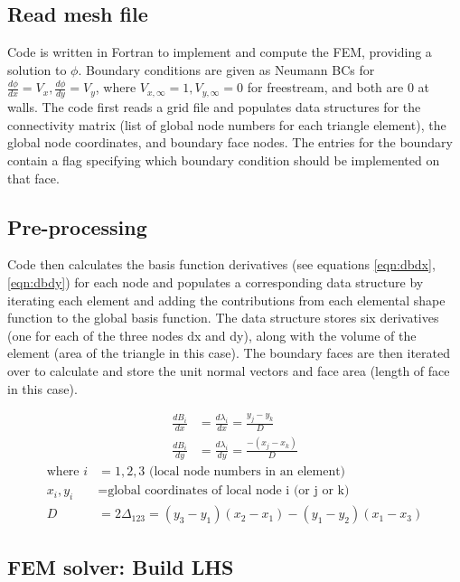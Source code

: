 \documentclass[conf]{new-aiaa}
\begin{document}
\subsection{Read mesh file}
\bigskip

Code is written in Fortran to implement and compute the FEM, providing a solution to $\phi$.  Boundary conditions are given as Neumann BCs for $\frac{d\phi}{dx} = V_x,\frac{d\phi}{dy} = V_y$, where $V_{x,\infty} = 1, V_{y,\infty} = 0$ for freestream, and both are 0 at walls.  The code first reads a grid file and populates data structures for the connectivity matrix (list of global node numbers for each triangle element), the global node coordinates, and boundary face nodes.  The entries for the boundary contain a flag specifying which boundary condition should be implemented on that face.

\subsection{Pre-processing}
\bigskip

Code then calculates the basis function derivatives (see equations \ref{eqn:dbdx},\ref{eqn:dbdy}) for each node and populates a corresponding data structure by iterating each element and adding the contributions from each elemental shape function to the global basis function.  The data structure stores six derivatives (one for each of the three nodes dx and dy), along with the volume of the element (area of the triangle in this case).  The boundary faces are then iterated over to calculate and store the unit normal vectors and face area (length of face in this case).

\begin{align}
	\frac{dB_i}{dx} &= \frac{d\lambda_i}{dx} = \frac{y_j-y_k}{D} \label{eqn:dbdx}\\
	\frac{dB_i}{dy} &= \frac{d\lambda_i}{dy} = \frac{-(x_j-x_k)}{D} \label{eqn:dbdy}
\end{align}
\begin{align*}
	\text{where\ \ \ \ }
	i &= 1,2,3 \text{ (local node numbers in an element)} \\
	x_i,y_i &= \text{global coordinates of local node i (or j or k)} \\
	D &= 2\Delta_{123} = (y_3-y_1)(x_2-x_1) - (y_1-y_2)(x_1-x_3)
\end{align*}

\subsection{FEM solver: Build LHS}
\bigskip
\end{document}
